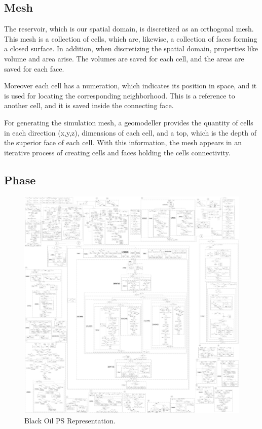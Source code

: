 \documentclass[review]{elsarticle}
\begin{document}
\subsection{Mesh}
The reservoir, which is our spatial domain, is discretized as an orthogonal mesh. This mesh is a collection of cells, which are, likewise, a collection of faces forming a closed surface. In addition, when discretizing the spatial domain, properties like volume and area arise. The volumes are saved for each cell, and the areas are saved for each face. 

Moreover each cell has a numeration, which indicates its position in space, and it is used for locating the corresponding neighborhood. This is a reference to another cell, and it is saved inside the connecting face. 

For generating the simulation mesh, a geomodeller provides the quantity of cells in each direction (x,y,z), dimensions of each cell, and a top, which is the depth of the superior face of each cell. With this information, the mesh appears in an iterative process of creating cells and faces holding the cells connectivity.

\subsection{Phase}

\newpage
{}
\begin{figure}
	\centering
	\includegraphics[width=1.0\textwidth]{Figures/Translated_PS.pdf}
	\caption{Black Oil PS Representation.}
	\label{fig:PS_Translated}
\end{figure}
\newpage
\restoregeometry
\end{document}
